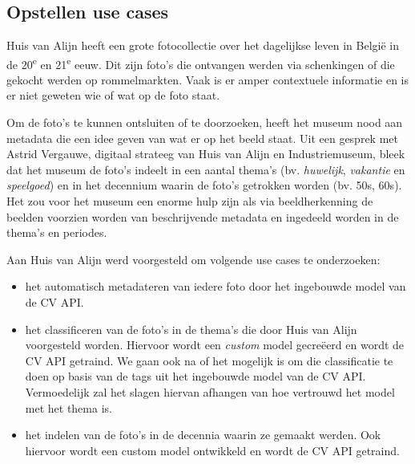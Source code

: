 
\chapter{}
\label{ch:methodologie}



\section{Opstellen use cases}
\label{sec:opstellen-use-cases}

Huis van Alijn heeft een grote fotocollectie over het dagelijkse leven in Belgi\"{e} in de 20\textsuperscript{e} en 21\textsuperscript{e} eeuw. Dit zijn foto’s die ontvangen werden via schenkingen of die gekocht werden op rommelmarkten. Vaak is er amper contextuele informatie en is er niet geweten wie of wat op de foto staat. 

Om de foto’s te kunnen ontsluiten of te doorzoeken, heeft het museum nood aan metadata die een idee geven van wat er op het beeld staat. Uit een gesprek met Astrid Vergauwe, digitaal strateeg van Huis van Alijn en Industriemuseum, bleek dat het museum de foto’s indeelt in een aantal thema’s (bv. \textit{huwelijk}, \textit{vakantie} en \textit{speelgoed}) en in het decennium waarin de foto’s getrokken worden (bv. 50s, 60s). Het zou voor het museum een enorme hulp zijn als via beeldherkenning de beelden voorzien worden van beschrijvende metadata en ingedeeld worden in de thema’s en periodes.

Aan Huis van Alijn werd voorgesteld om volgende use cases te onderzoeken:
\begin{itemize}
	\item het automatisch metadateren van iedere foto door het ingebouwde model van de CV API.
	\item het classificeren van de foto’s in de thema’s die door Huis van Alijn voorgesteld worden. Hiervoor wordt een \textit{custom} model gecre\"{e}erd en wordt de CV API getraind. We gaan ook na of het mogelijk is om die classificatie te doen op basis van de tags uit het ingebouwde model van de CV API. Vermoedelijk zal het slagen hiervan afhangen van hoe vertrouwd het model met het thema is. 
	\item het indelen van de foto’s in de decennia waarin ze gemaakt werden. Ook hiervoor wordt een custom model ontwikkeld en wordt de CV API getraind.
\end{itemize}

